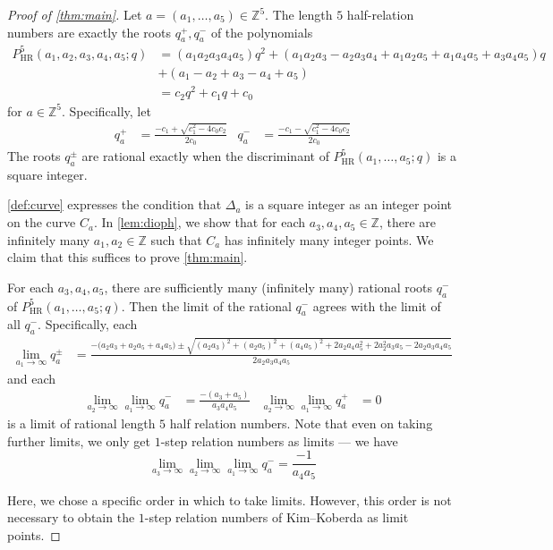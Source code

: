 \documentclass[10pt,a4paper]{amsart}
\begin{document}
\begin{proof}[Proof of \cref{thm:main}] 
Let $a = (a_{1}, \dots, a_{5}) \in \mathbb{Z}^{5}$. The length $5$ half-relation numbers are exactly the roots $q_{a}^{+}, q_{a}^{-}$ of the polynomials
\begin{align*}
	P_{\text{HR}}^5(a_1, a_2, a_3, a_4, a_5; q) & =  (a_1a_2a_3a_4a_5)q^2+(a_1a_2a_3-a_2a_3a_4+a_1a_2a_5+a_1a_4a_5+a_3a_4a_5)q\\
     & +(a_1-a_2+a_3-a_4+a_5) \\
     & = c_{2} q^{2} + c_{1} q + c_{0} 
\end{align*}
for $a \in \mathbb{Z}^{5}$. Specifically, let
\begin{align*}
	q_{a}^{+} & = \frac{- c_{1} + \sqrt{c_{1}^{2} - 4 c_{0} c_{2}}}{2 c_{0}} & q_{a}^{-} & = \frac{- c_{1} - \sqrt{c_{1}^{2} - 4 c_{0} c_{2}}}{2 c_{0}}
\end{align*}
The roots $q_{a}^{\pm}$ are rational exactly when the discriminant of $P_{\text{HR}}^{5}(a_{1}, \dots, a_{5}; q)$ is a square integer. 

\cref{def:curve} expresses the condition that $\Delta_{a}$ is a square integer as an integer point on the curve $C_{a}$. In \cref{lem:dioph}, we show that for each $a_{3}, a_{4}, a_{5} \in \mathbb{Z}$, there are infinitely many $a_{1}, a_{2} \in \mathbb{Z}$ such that $C_{a}$ has infinitely many integer points. We claim that this suffices to prove \cref{thm:main}. 

For each $a_{3}, a_{4}, a_{5}$, there are sufficiently many (infinitely many) rational roots $q_{a}^{-}$ of $P_{\text{HR}}^{5}(a_{1}, \dots, a_{5}; q)$. Then the limit of the rational $q_{a}^{-}$ agrees with the limit of all $q_{a}^{-}$. Specifically, each
\begin{align*}
	\lim_{a_1\rightarrow \infty} q_a^{\pm} & = \frac{-\big(a_2a_3+a_2a_5+a_4a_5\big) \pm \sqrt{(a_2a_3)^2+(a_2a_5)^2+(a_4a_5)^2+2a_2a_4a_5^2+2a_2^2a_3a_5-2a_2a_3a_4a_5}}{2a_2a_3a_4a_5}
\end{align*}
and each
\begin{align*}
	\lim_{a_{2} \to \infty} \lim_{a_{1} \to \infty} q_{a}^{-} & = \frac{-(a_{3} + a_{5})}{a_{3} a_{4} a_{5}} & \lim_{a_{2} \to \infty} \lim_{a_{1} \to \infty} q_{a}^{+} & = 0
\end{align*}
is a limit of rational length $5$ half relation numbers. Note that even on taking further limits, we only get $1$-step relation numbers as limits --- we have
\[
	\lim_{a_{3} \to \infty} \lim_{a_{2} \to \infty} \lim_{a_{1} \to \infty} q_{a}^{-} =  \frac{-1}{a_{4} a_{5}}
\]

Here, we chose a specific order in which to take limits. However, this order is not necessary to obtain the $1$-step relation numbers of Kim--Koberda as limit points.
\end{proof}
\end{document}
